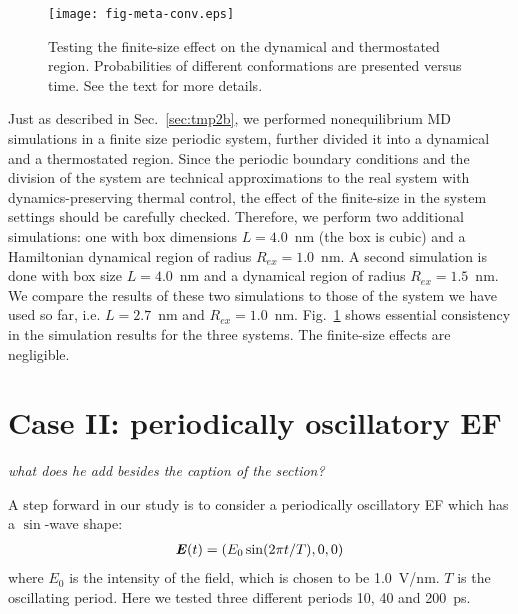 \documentclass[a4paper,preprint,unsortedaddress,onecolumn]{revtex4-1}
\newcommand{\bluec}[1]{{\color{blue} #1}}
\newcommand{\vect}[1]{\textbf{\textit{#1}}}
\begin{document}
\begin{figure}
  \centering
  \texttt{[image: fig-meta-conv.eps]}
  \caption{Testing the finite-size effect on the dynamical and thermostated region.
    Probabilities of different conformations are presented versus time.
    See the text for more details.
  }
  \label{fig:tmp7}
\end{figure}

Just as described in Sec.~\ref{sec:tmp2b}, we performed nonequilibrium MD
simulations in a finite size periodic system, further divided it
into a dynamical and a thermostated region.
Since the periodic boundary conditions and the division of the system
are technical approximations to the real system with dynamics-preserving thermal control, 
the effect of the finite-size in 
the system settings should be carefully checked.
Therefore, we
perform two additional simulations: one with box dimensions
$L=4.0$~nm (the box is cubic) and a
Hamiltonian dynamical region of radius $R_{ex} = 1.0$~nm. A second simulation is done with box size $L=4.0$~nm and a dynamical region of
radius $R_{ex} = 1.5$~nm. We compare the results of these two simulations to those of the system we have used so far, i.e. $L=2.7$~nm and $R_{ex} = 1.0$~nm.
Fig.~\ref{fig:tmp7} shows essential consistency in
the simulation results for the three systems. The finite-size effects are
negligible.



\section{Case II:
  periodically oscillatory EF}
\bluec{\textit{what does he add besides the caption of the section?}}

A step forward in our study is to consider a periodically oscillatory EF which has
a $\sin$-wave shape:
\begin{align}
  \vect E(t) = (E_0\sin(2\pi t / T), 0, 0)
\end{align}
where $E_0$ is the intensity of the field, which is chosen to be
1.0~V/nm.  $T$ is the oscillating period.
Here we tested three different
periods 10, 40 and 200~ps.
\end{document}
